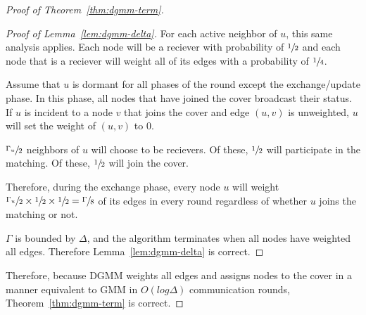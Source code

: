 \begin{proof}[Proof of Theorem~\ref{thm:dgmm-term}]
\begin{proof}[Proof of Lemma~\ref{lem:dgmm-delta}]
For each active neighbor of $u$, this same analysis applies. Each node will be a reciever with probability of $\sfrac{1}{2}$ and each node that is a reciever will weight all of its edges with a probability of $\sfrac{1}{4}$.

Assume that $u$ is dormant for all phases of the round except the exchange/update phase. In this phase, all nodes that have joined the cover broadcast their status. If $u$ is incident to a node $v$ that joins the cover and edge $(u,v)$ is unweighted, $u$ will set the weight of $(u,v)$ to 0. 

$\sfrac{\Gamma_u}{2}$ neighbors of $u$ will choose to be recievers. Of these, $\sfrac{1}{2}$ will participate in the matching. Of these, $\sfrac{1}{2}$ will join the cover.

Therefore, during the exchange phase, every node $u$ will weight $\sfrac{\Gamma_u}{2} \times \sfrac{1}{2} \times \sfrac{1}{2} = \sfrac{\Gamma}{8}$ of its edges in every round regardless of whether $u$ joins the matching or not. 

$\Gamma$ is bounded by $\Delta$, and the algorithm terminates when all nodes have weighted all edges. Therefore Lemma~\ref{lem:dgmm-delta} is correct.
\end{proof}

Therefore, because DGMM weights all edges and assigns nodes to the cover in a manner equivalent to GMM in $O(log \Delta)$ communication rounds, Theorem~\ref{thm:dgmm-term} is correct.
\end{proof}
